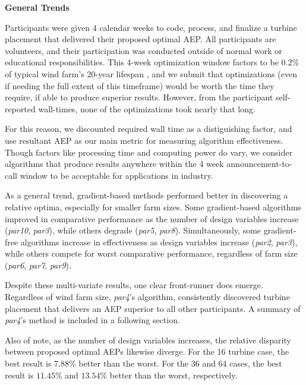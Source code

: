 \noindent\textbf{General Trends}\newline

Participants were given 4 calendar weeks to code, process, and finalize a turbine placement that delivered their proposed optimal AEP.
All participants are volunteers, and their participation was conducted outside of normal work or educational responsibilities.
This 4-week optimization window factors to be $0.2\%$ of typical wind farm's 20-year lifespan \cite{HerbertAcero2014}, and we submit that optimizations (even if needing the full extent of this timeframe) would be worth the time they require, if able to produce superior results.
However, from the participant self-reported wall-times, none of the optimizations took nearly that long.

For this reason, we discounted required wall time as a distiguishing factor, and use resultant AEP as our main metric for measuring algorithm effectiveness.
Though factors like processing time and computing power do vary, we consider algorithms that produce results anywhere within the 4 week announcement-to-call window to be acceptable for applications in industry.

As a general trend, gradient-based methods performed better in discovering a relative optima, especially for smaller farm sizes.
Some gradient-based algorithms improved in comparative performance as the number of design variables increase (\textit{par10}, \textit{par3}), while others degrade (\textit{par5}, \textit{par8}).
Simultaneously, some gradient-free algorithms increase in effectiveness as design variables increase (\textit{par2}, \textit{par3}), while others compete for worst comparative performance, regardless of farm size (\textit{par6}, \textit{par7}, \textit{par9}).

Despite these multi-variate results, one clear front-runner does emerge.
Regardless of wind farm size, \textit{par4}'s algorithm, consistently discovered turbine placement that delivers an AEP superior to all other participants.
A summary of \textit{par4}'s method is included in a following section.

Also of note, as the number of design variables increases, the relative disparity between proposed optimal AEPs likewise diverge.
For the 16 turbine case, the best result is $7.88\%$ better than the worst.
For the 36 and 64 cases, the best result is $11.45\%$ and $13.54\%$ better than the worst, respectively.

